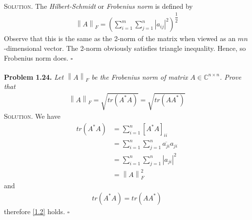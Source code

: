 \documentclass[a4paper,oneside]{book}
\numberwithin{equation}{chapter}
\begin{document}
\\
\textsc{Solution.} The \textit{Hilbert-Schmidt} or \textit{Frobenius norm} is defined by
\begin{align}
{\left\| A \right\|_F} = {\left( {\sum\limits_{i = 1}^m {\sum\limits_{j = 1}^n {{{\left| {{a_{ij}}} \right|}^2}} } } \right)^{\dfrac{1}{2}}}
\end{align}
Observe that this is the same as the 2-norm of the matrix when viewed as an $mn$-dimensional vector. The 2-norm obviously satisfies triangle inequality. Hence, so Frobenius norm does. \hfill $\square$\\\\
\textbf{Problem 1.24.} \textit{Let ${\left\| A \right\|_F}$ be the Frobenius norm of matrix $A \in \mathbb{C}^{n\times n}$. Prove that}
\begin{align}
\label{1.2}
{\left\| A \right\|_F} = \sqrt {tr\left( {{A^*}A} \right)}  = \sqrt {tr\left( {A{A^*}} \right)} 
\end{align}
\textsc{Solution.} We have
\begin{align}
tr\left( {{A^*}A} \right) &= \sum\limits_{i = 1}^n {{{\left[ {{A^*}A} \right]}_{ii}}} \\
 &= \sum\limits_{i = 1}^n {\sum\limits_{j = 1}^n {\overline {{a_{ji}}} {a_{ji}}} } \\
& = \sum\limits_{i = 1}^n {\sum\limits_{j = 1}^n {{{\left| {{a_{ji}}} \right|}^2}} } \\
 &= \left\| A \right\|_F^2
\end{align}
and 
\begin{align}
tr\left( {{A^*}A} \right) = tr\left( {A{A^*}} \right)
\end{align}
therefore \eqref{1.2} holds. \hfill $\square$
\end{document}
